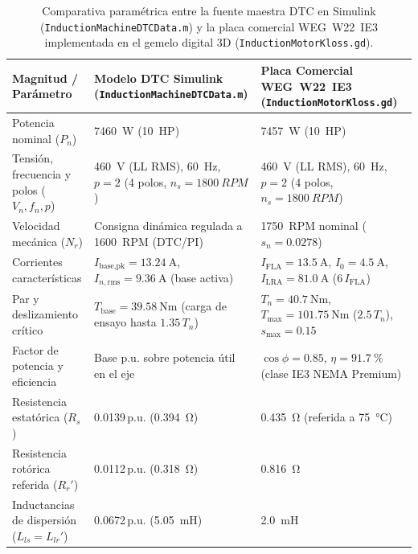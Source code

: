 \begin{table}[!t]
\begingroup\setlength{\tabcolsep}{4pt}\renewcommand{\arraystretch}{1.06}
\centering\footnotesize
\caption{Comparativa paramétrica entre la fuente maestra DTC en Simulink (\texttt{InductionMachineDTCData.m}) y la placa comercial WEG~W22~IE3 implementada en el gemelo digital 3D (\texttt{InductionMotorKloss.gd}).}
\label{tab:parametros_motor}
\begin{tabularx}{\textwidth}{@{} >{\raggedright\arraybackslash}p{4.3cm} >{\raggedright\arraybackslash}X >{\raggedright\arraybackslash}X @{}}
\toprule
\textbf{Magnitud / Parámetro} & \textbf{Modelo DTC Simulink (\texttt{InductionMachineDTCData.m})} & \textbf{Placa Comercial WEG~W22~IE3 (\texttt{InductionMotorKloss.gd})~\cite{WEG2024,IEC60034}} \\
\midrule
Potencia nominal ($P_n$) & \qty{7460}{\watt} (\qty{10}{HP}) & \qty{7457}{\watt} (\qty{10}{HP}) \\
Tensión, frecuencia y polos ($V_n, f_n, p$) & \qty{460}{\volt} (LL RMS), \qty{60}{\hertz}, $p=2$ (4 polos, $n_s=\qty{1800}{RPM}$) & \qty{460}{\volt} (LL RMS), \qty{60}{\hertz}, $p=2$ (4 polos, $n_s=\qty{1800}{RPM}$) \\
Velocidad mecánica ($N_r$) & Consigna dinámica regulada a \qty{1600}{RPM} (DTC/PI) & \qty{1750}{RPM} nominal ($s_n = \num{0.0278}$) \\
Corrientes características & $I_{\text{base,pk}}=\qty{13.24}{\ampere}$, $I_{n,\text{rms}}=\qty{9.36}{\ampere}$ (base activa) & $I_{\text{FLA}}=\qty{13.5}{\ampere}$, $I_0=\qty{4.5}{\ampere}$, $I_{\text{LRA}}=\qty{81.0}{\ampere}$ ($6\,I_{\text{FLA}}$) \\
Par y deslizamiento crítico & $T_{\text{base}}=\qty{39.58}{\newton\meter}$ (carga de ensayo hasta $1.35\,T_n$) & $T_n=\qty{40.7}{\newton\meter}$, $T_{\max}=\qty{101.75}{\newton\meter}$ ($2.5\,T_n$), $s_{\max}=\num{0.15}$ \\
Factor de potencia y eficiencia & Base p.u. sobre potencia útil en el eje & $\cos\phi=\num{0.85}$, $\eta=\qty{91.7}{\percent}$ (clase IE3 NEMA Premium) \\
Resistencia estatórica ($R_s$) & \num{0.0139}\,p.u. (\qty{0.394}{\ohm}) & \qty{0.435}{\ohm} (referida a \qty{75}{\celsius}) \\
Resistencia rotórica referida ($R_r'$) & \num{0.0112}\,p.u. (\qty{0.318}{\ohm}) & \qty{0.816}{\ohm} \\
Inductancias de dispersión ($L_{ls}=L_{lr}'$) & \num{0.0672}\,p.u. (\qty{5.05}{\milli\henry}) & \qty{2.0}{\milli\henry} \\

\end{tabularx}
\end{table}
